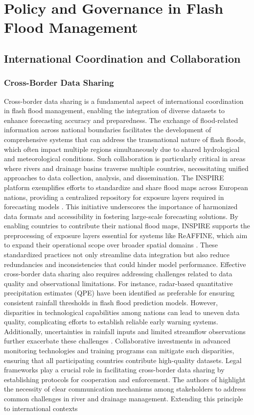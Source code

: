 \section{Policy and Governance in Flash Flood Management}
\subsection{International Coordination and Collaboration}
\subsubsection{Cross-Border Data Sharing}
Cross-border data sharing is a fundamental aspect of international coordination in flash flood management, enabling the integration of diverse datasets to enhance forecasting accuracy and preparedness. The exchange of flood-related information across national boundaries facilitates the development of comprehensive systems that can address the transnational nature of flash floods, which often impact multiple regions simultaneously due to shared hydrological and meteorological conditions. Such collaboration is particularly critical in areas where rivers and drainage basins traverse multiple countries, necessitating unified approaches to data collection, analysis, and dissemination. The INSPIRE platform exemplifies efforts to standardize and share flood maps across European nations, providing a centralized repository for exposure layers required in forecasting models \citep{Ritter2021a}\citep{Ritter2021b}. This initiative underscores the importance of harmonized data formats and accessibility in fostering large-scale forecasting solutions. By enabling countries to contribute their national flood maps, INSPIRE supports the preprocessing of exposure layers essential for systems like ReAFFINE, which aim to expand their operational scope over broader spatial domains \citep{Ritter2021a}\citep{Ritter2021b}. These standardized practices not only streamline data integration but also reduce redundancies and inconsistencies that could hinder model performance. Effective cross-border data sharing also requires addressing challenges related to data quality and observational limitations. For instance, radar-based quantitative precipitation estimates (QPE) have been identified as preferable for ensuring consistent rainfall thresholds in flash flood prediction models. However, disparities in technological capabilities among nations can lead to uneven data quality, complicating efforts to establish reliable early warning systems. Additionally, uncertainties in rainfall inputs and limited streamflow observations further exacerbate these challenges \citep{Msigwa2024}. Collaborative investments in advanced monitoring technologies and training programs can mitigate such disparities, ensuring that all participating countries contribute high-quality datasets. Legal frameworks play a crucial role in facilitating cross-border data sharing by establishing protocols for cooperation and enforcement. The authors of \citep{Saad2024} highlight the necessity of clear communication mechanisms among stakeholders to address common challenges in river and drainage management. Extending this principle to international contexts 